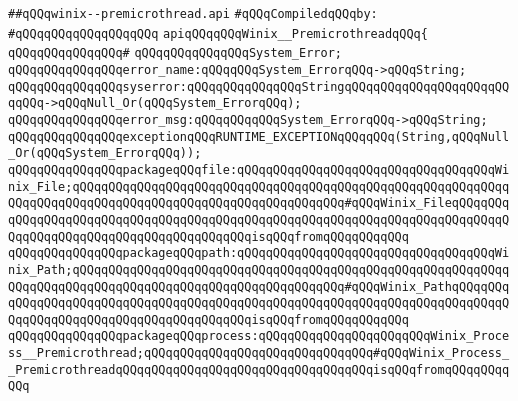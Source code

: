\label{src/lib/std/src/winix/winix--premicrothread.api}
\verb|##qQQqwinix--premicrothread.api|\newline
\newline
\verb|#qQQqCompiledqQQqby:|\newline
\verb|#qQQqqQQqqQQqqQQqqQQq|\newline
\newline
\newline
\newline
\verb|apiqQQqqQQqWinix__PremicrothreadqQQq{|\newline
\verb|qQQqqQQqqQQqqQQq#|\newline
\verb|qQQqqQQqqQQqqQQqSystem_Error;|\newline
\newline
\verb|qQQqqQQqqQQqqQQqerror_name:qQQqqQQqSystem_ErrorqQQq->qQQqString;|\newline
\verb|qQQqqQQqqQQqqQQqsyserror:qQQqqQQqqQQqqQQqStringqQQqqQQqqQQqqQQqqQQqqQQqqQQq->qQQqNull_Or(qQQqSystem_ErrorqQQq);|\newline
\verb|qQQqqQQqqQQqqQQqerror_msg:qQQqqQQqqQQqSystem_ErrorqQQq->qQQqString;|\newline
\newline
\verb|qQQqqQQqqQQqqQQqexceptionqQQqRUNTIME_EXCEPTIONqQQqqQQq(String,qQQqNull_Or(qQQqSystem_ErrorqQQq));|\newline
\newline
\verb|qQQqqQQqqQQqqQQqpackageqQQqfile:qQQqqQQqqQQqqQQqqQQqqQQqqQQqqQQqqQQqWinix_File;qQQqqQQqqQQqqQQqqQQqqQQqqQQqqQQqqQQqqQQqqQQqqQQqqQQqqQQqqQQqqQQqqQQqqQQqqQQqqQQqqQQqqQQqqQQqqQQqqQQqqQQqqQQq#qQQqWinix_FileqQQqqQQqqQQqqQQqqQQqqQQqqQQqqQQqqQQqqQQqqQQqqQQqqQQqqQQqqQQqqQQqqQQqqQQqqQQqqQQqqQQqqQQqqQQqqQQqqQQqqQQqqQQqqQQqisqQQqfromqQQqqQQqqQQq|\newline
\verb|qQQqqQQqqQQqqQQqpackageqQQqpath:qQQqqQQqqQQqqQQqqQQqqQQqqQQqqQQqqQQqWinix_Path;qQQqqQQqqQQqqQQqqQQqqQQqqQQqqQQqqQQqqQQqqQQqqQQqqQQqqQQqqQQqqQQqqQQqqQQqqQQqqQQqqQQqqQQqqQQqqQQqqQQqqQQqqQQq#qQQqWinix_PathqQQqqQQqqQQqqQQqqQQqqQQqqQQqqQQqqQQqqQQqqQQqqQQqqQQqqQQqqQQqqQQqqQQqqQQqqQQqqQQqqQQqqQQqqQQqqQQqqQQqqQQqqQQqqQQqisqQQqfromqQQqqQQqqQQq|\newline
\verb|qQQqqQQqqQQqqQQqpackageqQQqprocess:qQQqqQQqqQQqqQQqqQQqqQQqWinix_Process__Premicrothread;qQQqqQQqqQQqqQQqqQQqqQQqqQQqqQQq#qQQqWinix_Process__PremicrothreadqQQqqQQqqQQqqQQqqQQqqQQqqQQqqQQqqQQqisqQQqfromqQQqqQQqqQQq|\newline
